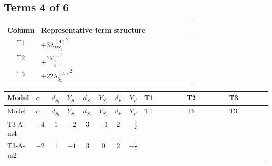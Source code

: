 \documentclass[8pt]{article}
\begin{document}
\begin{landscape}
\subsection*{Terms 4 of 6}
\begin{center}
\begin{tabular}{@{}c >{\raggedright\arraybackslash}p{0.82\linewidth}@{}}
\toprule
Column & Representative term structure \\
\midrule
T1 & \(\displaystyle +3 {\lambda_{HS_2}^{(A)}}^2\) \\
\midrule
T2 & \(\displaystyle +\frac{7 {\lambda_{S_2}^{(1)}}^2}{4}\) \\
\midrule
T3 & \(\displaystyle +22 {\lambda_{S_2}^{(A)}}^2\) \\
\midrule
\bottomrule
\end{tabular}
\end{center}
\smallskip
\tiny
\begin{longtable}{@{}llcccccc >{\raggedright\arraybackslash}p{0.21\linewidth} >{\raggedright\arraybackslash}p{0.21\linewidth} >{\raggedright\arraybackslash}p{0.21\linewidth}@{}}
\toprule
Model & $\alpha$ & $d_{S_1}$ & $Y_{S_1}$ & $d_{S_2}$ & $Y_{S_2}$ & $d_F$ & $Y_F$ & T1 & T2 & T3 \\
\midrule
\endfirsthead
\toprule
Model & $\alpha$ & $d_{S_1}$ & $Y_{S_1}$ & $d_{S_2}$ & $Y_{S_2}$ & $d_F$ & $Y_F$ & T1 & T2 & T3 \\
\midrule
\endhead
T3-A-m4 & $-4$ & $1$ & $-2$ & $3$ & $-1$ & $2$ & $-\frac{3}{2}$ & \scriptsize\adjustbox{max width=\linewidth}{$\begin{gathered} +3 {\lambda_{HS_2}^{(A)}}^2\end{gathered}$} & \scriptsize\adjustbox{max width=\linewidth}{$\begin{gathered} +\frac{7 {\lambda_{S_2}^{(1)}}^2}{4}\end{gathered}$} & \scriptsize\adjustbox{max width=\linewidth}{$\begin{gathered} +22 {\lambda_{S_2}^{(A)}}^2\end{gathered}$} \\
\midrule
T3-A-m2 & $-2$ & $1$ & $-1$ & $3$ & $0$ & $2$ & $-\frac{1}{2}$ & \scriptsize\adjustbox{max width=\linewidth}{$\begin{gathered} +3 {\lambda_{HS_2}^{(A)}}^2\end{gathered}$} & \scriptsize\adjustbox{max width=\linewidth}{$\begin{gathered} +\frac{7 {\lambda_{S_2}^{(1)}}^2}{4}\end{gathered}$} & \scriptsize\adjustbox{max width=\linewidth}{$\begin{gathered} +22 {\lambda_{S_2}^{(A)}}^2\end{gathered}$} \\

\end{longtable}
\end{landscape}
\end{document}
